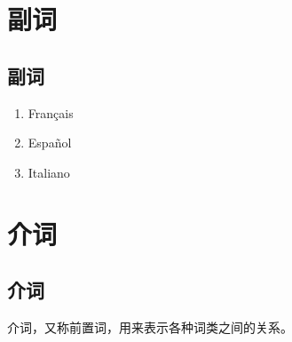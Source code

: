 \documentclass[UTF8,a4paper,titlepage,10pt]{report}
\begin{document}
\chapter{副词}
\label{sec:orgc18abfb}

\section{副词}
\label{sec:org54fd357}

\begin{enumerate}
\item Français
\label{sec:org5669486}

\item Español
\label{sec:org1a4be3d}

\item Italiano
\label{sec:org43f8a44}
\end{enumerate}

\chapter{介词}
\label{sec:org055aaf0}

\section{介词}
\label{sec:org9f1d740}

介词，又称前置词，用来表示各种词类之间的关系。
\end{document}
